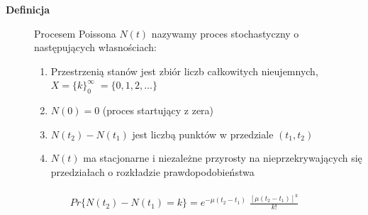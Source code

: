 \documentclass[a4paper,12pt,polish]{sphinxmanual}
\begin{document}
\begin{description}
\item[{\textbf{Definicja}}] \leavevmode
Procesem Poissona $N(t)$ nazywamy proces stochastyczny o następujących własnościach:
\begin{enumerate}
\item {} 
Przestrzenią stanów jest zbiór liczb całkowitych nieujemnych, $X=\{k\}_0^{\infty}\; = \{0, 1, 2, \dots \}$

\item {} 
$N(0) = 0$ (proces startujący z zera)

\item {} 
$N(t_2) - N(t_1)$ jest liczbą punktów w przedziale $(t_1, t_2)$

\item {} 
$N(t)$ ma stacjonarne i niezależne przyrosty na nieprzekrywających się przedziałach o rozkładzie prawdopodobieństwa

\end{enumerate}

\end{description}
\label{ch3/chIII021:equation-eqn24}\begin{gather}
\begin{split}  Pr\{N(t_2) - N(t_1) =k\} = e^{-\mu (t_2 - t_1)} \; \frac{[\mu (t_2 - t_1)]^k}{k!}\end{split}\label{ch3/chIII021-eqn24}
\end{gather}
\end{document}

